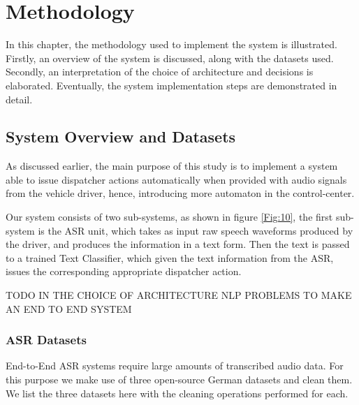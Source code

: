 \chapter{Methodology}
\label{chap:methodology}

In this chapter, the methodology used to implement the system is illustrated. Firstly, an overview of the system is discussed, along with the datasets used. Secondly, an interpretation of the choice of architecture and decisions is elaborated. Eventually, the system implementation steps are demonstrated in detail.



\section{System Overview and Datasets} 
\label{meth:s1}


As discussed earlier, the main purpose of this study is to implement a system able to issue dispatcher actions automatically when provided with audio signals from the vehicle driver, hence, introducing more automaton in the control-center. 

Our system consists of two sub-systems, as shown in figure \ref{Fig:10}, the first sub-system is the \ac{ASR} unit, which takes as input raw speech waveforms produced by the driver, and produces the information in a text form. Then the text is passed to a trained Text Classifier, which given the text information from the \ac{ASR}, issues the corresponding appropriate dispatcher action.

TODO IN THE CHOICE OF ARCHITECTURE NLP PROBLEMS TO MAKE AN END TO END SYSTEM


\subsection{\ac{ASR} Datasets}
\label{meth:sub1}

End-to-End \ac{ASR} systems require large amounts of transcribed audio data. For this purpose we make use of three open-source German datasets and clean them. We list the three datasets here with the cleaning operations performed for each. 


